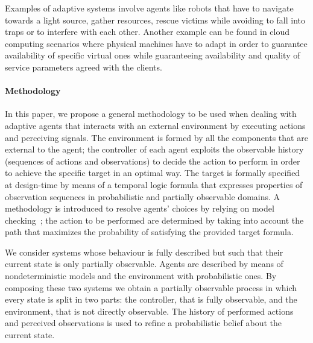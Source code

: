 Examples of adaptive systems involve agents like robots that have to navigate towards a light source, gather resources, rescue victims while avoiding to fall into traps or to interfere with each other.
Another example  can be found in cloud computing scenarios where physical machines have to adapt in order to guarantee availability of specific virtual ones while guaranteeing availability and quality of service parameters agreed with the clients. 
%

\paragraph{Methodology} %
\label{par:methodology}
In this paper, we propose a general methodology to be used when dealing with adaptive agents that interacts with an external environment by executing actions and perceiving signals. The environment is formed by all the components that are external to the agent; the controller of each agent exploits the observable history (sequences of actions and observations) to decide the action to perform in order to achieve the specific target in an optimal way. The target is formally specified at design-time by means of a temporal logic formula  that expresses properties of observation sequences in probabilistic and partially observable domains. A methodology is introduced to resolve agents' choices by relying on model checking~\cite{Katoen-Baier};  the action to be performed are determined by taking into account the path that maximizes the probability of satisfying the provided target formula.

We consider systems whose behaviour is fully described but such that their current state is 
only partially observable. Agents are described by means of  nondeterministic models and the environment with probabilistic ones. By composing these two systems we obtain a partially observable process in which every state is split in two parts: the controller, that is fully observable, and the environment, that is not directly observable. The history of performed actions and perceived observations is used to refine a probabilistic belief about the current state.

